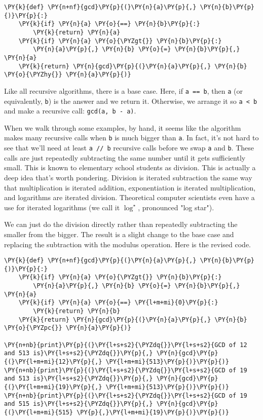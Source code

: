 \begin{Verbatim}[commandchars=\\\{\}]
\PY{k}{def} \PY{n+nf}{gcd}\PY{p}{(}\PY{n}{a}\PY{p}{,} \PY{n}{b}\PY{p}{)}\PY{p}{:}
    \PY{k}{if} \PY{n}{a} \PY{o}{==} \PY{n}{b}\PY{p}{:}
        \PY{k}{return} \PY{n}{a}
    \PY{k}{if} \PY{n}{a} \PY{o}{\PYZgt{}} \PY{n}{b}\PY{p}{:}
        \PY{n}{a}\PY{p}{,} \PY{n}{b} \PY{o}{=} \PY{n}{b}\PY{p}{,} \PY{n}{a}
    \PY{k}{return} \PY{n}{gcd}\PY{p}{(}\PY{n}{a}\PY{p}{,} \PY{n}{b} \PY{o}{\PYZhy{}} \PY{n}{a}\PY{p}{)}
\end{Verbatim}



Like all recursive algorithms, there is a base case.
Here, if \texttt{a == b}, then \texttt{a} (or equivalently, \texttt{b}) is the answer and we return it.
Otherwise, we arrange it so \texttt{a < b} and make a recursive call: \texttt{gcd(a, b - a)}.


When we walk through some examples, by hand, it seems like the algorithm makes many recursive calls when \texttt{b} is much bigger than \texttt{a}.
In fact, it's not hard to see that we'll need at least \texttt{a // b} recursive calls before we swap \texttt{a} and \texttt{b}.
These calls are just repeatedly subtracting the same number until it gets sufficiently small.
This is known to elementary school students as division.
This is actually a deep idea that's worth pondering.  Division is iterated subtraction the same way that multiplication is iterated addition, exponentiation is iterated multiplication, and logarithms are iterated division.
Theoretical computer scientists even have a use for iterated logarithms (we call it $\log^\star$, pronounced "log star").


We can just do the division directly rather than repeatedly subtracting the smaller from the bigger.
The result is a slight change to the base case and replacing the subtraction with the modulus operation.
Here is the revised code.

\begin{Verbatim}[commandchars=\\\{\}]
\PY{k}{def} \PY{n+nf}{gcd}\PY{p}{(}\PY{n}{a}\PY{p}{,} \PY{n}{b}\PY{p}{)}\PY{p}{:}
    \PY{k}{if} \PY{n}{a} \PY{o}{\PYZgt{}} \PY{n}{b}\PY{p}{:}
        \PY{n}{a}\PY{p}{,} \PY{n}{b} \PY{o}{=} \PY{n}{b}\PY{p}{,} \PY{n}{a}
    \PY{k}{if} \PY{n}{a} \PY{o}{==} \PY{l+m+mi}{0}\PY{p}{:}
        \PY{k}{return} \PY{n}{b}
    \PY{k}{return} \PY{n}{gcd}\PY{p}{(}\PY{n}{a}\PY{p}{,} \PY{n}{b} \PY{o}{\PYZpc{}} \PY{n}{a}\PY{p}{)}

\PY{n+nb}{print}\PY{p}{(}\PY{l+s+s2}{\PYZdq{}}\PY{l+s+s2}{GCD of 12 and 513 is}\PY{l+s+s2}{\PYZdq{}}\PY{p}{,} \PY{n}{gcd}\PY{p}{(}\PY{l+m+mi}{12}\PY{p}{,} \PY{l+m+mi}{513}\PY{p}{)}\PY{p}{)}
\PY{n+nb}{print}\PY{p}{(}\PY{l+s+s2}{\PYZdq{}}\PY{l+s+s2}{GCD of 19 and 513 is}\PY{l+s+s2}{\PYZdq{}}\PY{p}{,} \PY{n}{gcd}\PY{p}{(}\PY{l+m+mi}{19}\PY{p}{,} \PY{l+m+mi}{513}\PY{p}{)}\PY{p}{)}
\PY{n+nb}{print}\PY{p}{(}\PY{l+s+s2}{\PYZdq{}}\PY{l+s+s2}{GCD of 19 and 515 is}\PY{l+s+s2}{\PYZdq{}}\PY{p}{,} \PY{n}{gcd}\PY{p}{(}\PY{l+m+mi}{515} \PY{p}{,}\PY{l+m+mi}{19}\PY{p}{)}\PY{p}{)}
\end{Verbatim}



